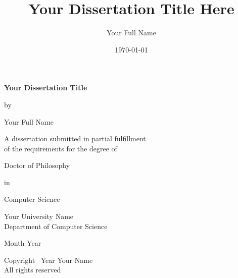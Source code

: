 \documentclass[12pt,oneside]{book}
\title{Your Dissertation Title Here}
\author{Your Full Name}
\date{\today}
\begin{document}

\frontmatter

\begin{titlepage}
    \centering
    \vspace*{1cm}

    {\LARGE\bfseries Your Dissertation Title\par}
    \vspace{1cm}

    {\Large by\par}
    \vspace{0.5cm}

    {\Large Your Full Name\par}
    \vspace{2cm}

    {A dissertation submitted in partial fulfillment\\
    of the requirements for the degree of\par}
    \vspace{0.5cm}

    {\large Doctor of Philosophy\par}
    \vspace{0.5cm}

    {in\par}
    \vspace{0.5cm}

    {\large Computer Science\par}  %
    \vspace{2cm}

    {\large Your University Name\\
    Department of Computer Science\par}  %
    \vspace{1cm}

    {\large Month Year\par}

\end{titlepage}

\newpage
\thispagestyle{empty}
\vspace*{\fill}
\begin{center}
    Copyright \textcopyright\ Year Your Name\\
    All rights reserved
\end{center}
\vspace*{\fill}
\end{document}
